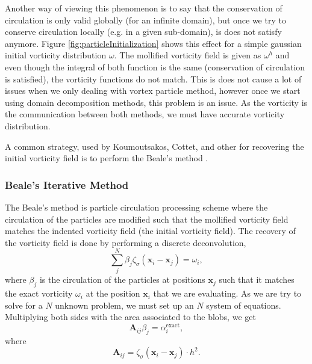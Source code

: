 Another way of viewing this phenomenon is to say that the conservation of circulation is only valid globally (for an infinite domain), but once we try to conserve circulation locally (e.g. in a given sub-domain), is does not satisfy anymore. Figure \ref{fig:particleInitialization} shows this effect for a simple gaussian initial vorticity distribution $\omega$. The mollified vorticity field is given as $\omega^h$ and even though the integral of both function is the same (conservation of circulation is satisfied), the vorticity functions do not match. This is does not cause a lot of issues when we only dealing with vortex particle method, however once we start using domain decomposition methods, this problem is an issue. As the vorticity is the communication between both methods, we must have accurate vorticity distribution.

A common strategy, used by Koumoutsakos, Cottet, and other for recovering the initial vorticity field is to perform the Beale's method \cite{Beale1988} \cite{Cottet2000a}.


\subsubsection*{Beale's Iterative Method}

The Beale's method is particle circulation processing scheme where the circulation of the particles are modified such that the mollified vorticity field matches the indented vorticity field (the initial vorticity field). The recovery of the vorticity field is done by performing a discrete deconvolution,
	\begin{equation}
	\sum_j^N \beta_j \zeta_{\sigma}\left(\mathbf{x}_i-\mathbf{x}_j\right) = \omega_i,
		\end{equation}
where $\beta_j$ is the circulation of the particles at positions $\mathbf{x}_j$ such that it matches the exact vorticity $\omega_i$ at the position $\mathbf{x}_i$ that we are evaluating.  As we are try to solve for a $N$ unknown problem, we must set up an $N$ system of equations. Multiplying both sides with the area associated to the blobs, we get
	\begin{equation}
	\mathbf{A}_{ij} \beta_j = \alpha_i^{\mathrm{exact}},
	\end{equation}
where
	\begin{equation}
	\mathbf{A}_{ij} = \zeta_{\sigma}\left(\mathbf{x}_i - \mathbf{x}_j\right) \cdot h^2.
	\end{equation}

